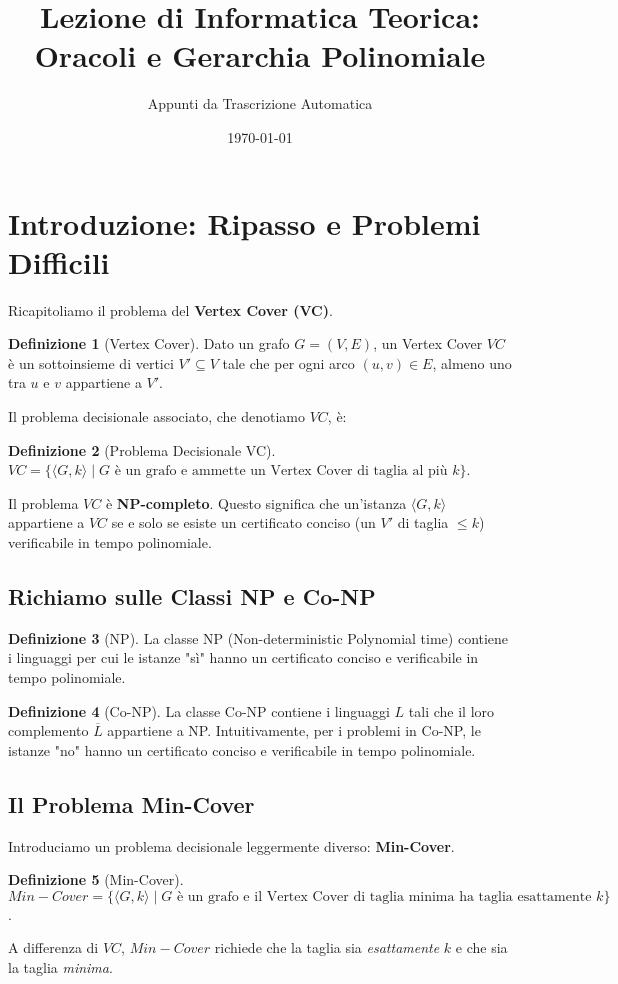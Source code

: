 \documentclass[a4paper]{article}
\title{Lezione di Informatica Teorica: Oracoli e Gerarchia Polinomiale}
\author{Appunti da Trascrizione Automatica}
\date{\today}
\theoremstyle{definition} %
\newtheorem{definition}{Definizione}
\begin{document}
\maketitle
\tableofcontents
\newpage

\section{Introduzione: Ripasso e Problemi Difficili}

Ricapitoliamo il problema del \textbf{Vertex Cover (VC)}.
\begin{definition}[Vertex Cover]
Dato un grafo $G=(V,E)$, un Vertex Cover $VC$ è un sottoinsieme di vertici $V' \subseteq V$ tale che per ogni arco $(u,v) \in E$, almeno uno tra $u$ e $v$ appartiene a $V'$.
\end{definition}

Il problema decisionale associato, che denotiamo $VC$, è:
\begin{definition}[Problema Decisionale VC]
$VC = \{ \langle G, k \rangle \mid G \text{ è un grafo e ammette un Vertex Cover di taglia al più } k \}$.
\end{definition}
Il problema $VC$ è \textbf{NP-completo}. Questo significa che un'istanza $\langle G,k \rangle$ appartiene a $VC$ se e solo se esiste un certificato conciso (un $V'$ di taglia $\le k$) verificabile in tempo polinomiale.

\subsection{Richiamo sulle Classi NP e Co-NP}
\begin{definition}[NP]
La classe NP (Non-deterministic Polynomial time) contiene i linguaggi per cui le istanze "sì" hanno un certificato conciso e verificabile in tempo polinomiale.
\end{definition}
\begin{definition}[Co-NP]
La classe Co-NP contiene i linguaggi $L$ tali che il loro complemento $\overline{L}$ appartiene a NP. Intuitivamente, per i problemi in Co-NP, le istanze "no" hanno un certificato conciso e verificabile in tempo polinomiale.
\end{definition}

\subsection{Il Problema Min-Cover}
Introduciamo un problema decisionale leggermente diverso: \textbf{Min-Cover}.
\begin{definition}[Min-Cover]
$Min-Cover = \{ \langle G, k \rangle \mid G \text{ è un grafo e il Vertex Cover di taglia minima ha taglia esattamente } k \}$.
\end{definition}
A differenza di $VC$, $Min-Cover$ richiede che la taglia sia \emph{esattamente} $k$ e che sia la taglia \emph{minima}.
\end{document}
